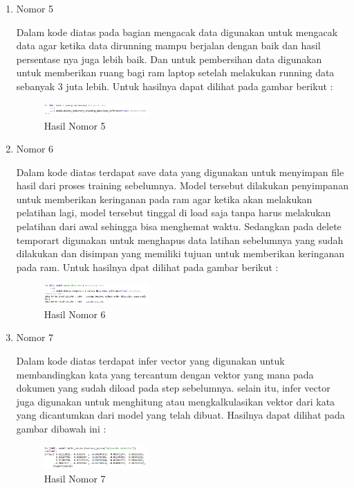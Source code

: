 \begin{enumerate}
\item Nomor 5
\hfill\break
	
Dalam kode diatas pada bagian mengacak data digunakan untuk mengacak data agar ketika data dirunning mampu berjalan dengan baik dan hasil persentase nya juga lebih baik. Dan untuk pembersihan data digunakan untuk memberikan ruang bagi ram laptop setelah melakukan running data sebanyak 3 juta lebih. Untuk hasilnya dapat dilihat pada gambar berikut :
\hfill\break
	\begin{figure}[H]
		\includegraphics[width=4cm]{figures/1174054/5/29.png}
		\centering
		\caption{Hasil Nomor 5}
	\end{figure}
	
\item Nomor 6\\
\hfill\break
	
Dalam kode diatas terdapat save data yang digunakan untuk menyimpan file hasil dari proses training sebelumnya. Model tersebut dilakukan penyimpanan untuk memberikan keringanan pada ram agar ketika akan melakukan pelatihan lagi, model tersebut tinggal di load saja tanpa harus melakukan pelatihan dari awal sehingga bisa menghemat waktu. Sedangkan pada delete temporart digunakan untuk menghapus data latihan sebelumnya yang sudah dilakukan dan disimpan yang memiliki tujuan untuk memberikan keringanan pada ram. Untuk hasilnya dpat dilihat pada gambar berikut :
\hfill\break
	\begin{figure}[H]
		\includegraphics[width=4cm]{figures/1174054/5/30.png}
		\centering
		\caption{Hasil Nomor 6}
	\end{figure}
	
\item Nomor 7
\hfill\break
	
Dalam kode diatas terdapat infer vector yang digunakan untuk membandingkan kata yang tercantum dengan vektor yang mana pada dokumen yang sudah diload pada step sebelumnya. selain itu, infer vector juga digunakan untuk menghitung atau mengkalkulasikan vektor dari kata yang dicantumkan dari model yang telah dibuat. Hasilnya dapat dilihat pada gambar dibawah ini :
\hfill\break
	\begin{figure}[H]
		\includegraphics[width=4cm]{figures/1174054/5/31.png}
		\centering
		\caption{Hasil Nomor 7}
	\end{figure}
	

\end{enumerate}
